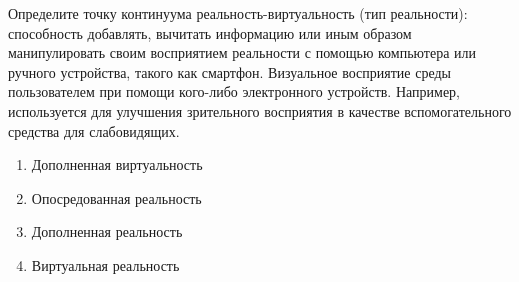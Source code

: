 
Определите точку континуума реальность-виртуальность (тип реальности): способность добавлять, вычитать информацию или иным образом манипулировать своим восприятием реальности с помощью компьютера или ручного устройства, такого как смартфон. Визуальное восприятие среды пользователем при помощи кого-либо электронного устройств. Например, используется для улучшения зрительного восприятия в качестве вспомогательного средства для слабовидящих.

\begin{enumerate}
    \item Дополненная виртуальность
    \item Опосредованная реальность
    \item Дополненная реальность
    \item Виртуальная реальность
\end{enumerate}

